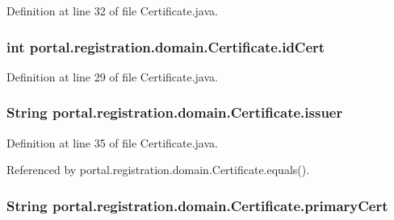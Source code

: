 Definition at line 32 of file Certificate.java.

\hypertarget{classportal_1_1registration_1_1domain_1_1Certificate_a0861b0203d5d1924de38adf80ecde323}{
\subsubsection[{idCert}]{\setlength{\rightskip}{0pt plus 5cm}int {\bf portal.registration.domain.Certificate.idCert}}}
\label{classportal_1_1registration_1_1domain_1_1Certificate_a0861b0203d5d1924de38adf80ecde323}


Definition at line 29 of file Certificate.java.

\hypertarget{classportal_1_1registration_1_1domain_1_1Certificate_a3d2cd307e97c90342894a007fb235d0c}{
\subsubsection[{issuer}]{\setlength{\rightskip}{0pt plus 5cm}String {\bf portal.registration.domain.Certificate.issuer}}}
\label{classportal_1_1registration_1_1domain_1_1Certificate_a3d2cd307e97c90342894a007fb235d0c}


Definition at line 35 of file Certificate.java.



Referenced by portal.registration.domain.Certificate.equals().

\hypertarget{classportal_1_1registration_1_1domain_1_1Certificate_a3a4632cbb077929d70538d0d4a07e1bd}{
\subsubsection[{primaryCert}]{\setlength{\rightskip}{0pt plus 5cm}String {\bf portal.registration.domain.Certificate.primaryCert}}}
\label{classportal_1_1registration_1_1domain_1_1Certificate_a3a4632cbb077929d70538d0d4a07e1bd}


